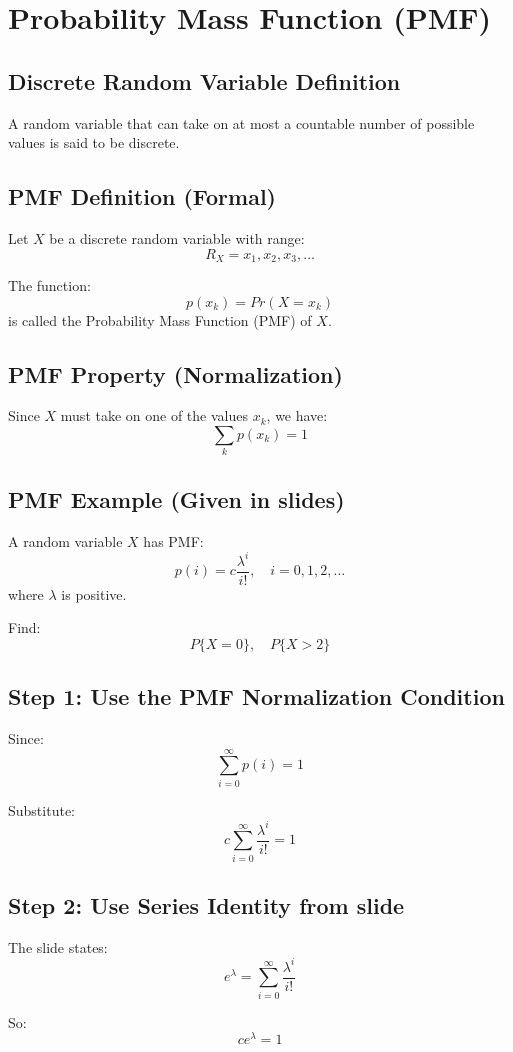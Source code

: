 \documentclass{article}
\begin{document}
\section{Probability Mass Function (PMF)}

\subsection{Discrete Random Variable Definition}
A random variable that can take on at most a countable number of possible values is said to be discrete.

\subsection{PMF Definition (Formal)}
Let $X$ be a discrete random variable with range:
\[
R_X=x_1,x_2,x_3,\dots
\]

The function:
\[
p(x_k)=Pr(X=x_k)
\]
is called the Probability Mass Function (PMF) of $X$.

\subsection{PMF Property (Normalization)}
Since $X$ must take on one of the values $x_k$, we have:
\[
\sum_k p(x_k)=1
\]

\subsection{PMF Example (Given in slides)}

A random variable $X$ has PMF:
\[
p(i)=c\frac{\lambda^i}{i!},\quad i=0,1,2,\dots
\]
where $\lambda$ is positive.

Find:
\[
P\{X=0\},\quad P\{X>2\}
\]

\subsection{Step 1: Use the PMF Normalization Condition}
Since:
\[
\sum_{i=0}^{\infty}p(i)=1
\]

Substitute:
\[
c\sum_{i=0}^{\infty}\frac{\lambda^i}{i!}=1
\]

\subsection{Step 2: Use Series Identity from slide}
The slide states:
\[
e^\lambda=\sum_{i=0}^{\infty}\frac{\lambda^i}{i!}
\]

So:
\[
ce^\lambda=1
\]
\end{document}
